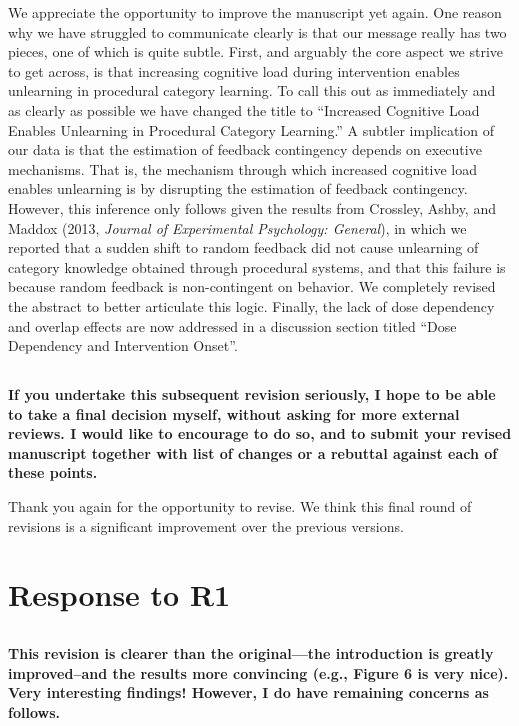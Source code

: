 \documentclass[10pt,a4paper]{article}
\begin{document}
We appreciate the opportunity to improve the manuscript yet again. One reason
why we have struggled to communicate clearly is that our message really has two
pieces, one of which is quite subtle. First, and arguably the core aspect we
strive to get across, is that increasing cognitive load during intervention
enables unlearning in procedural category learning. To call this out as
immediately and as clearly as possible we have changed the title to ``Increased
Cognitive Load Enables Unlearning in Procedural Category Learning.'' A subtler
implication of our data is that the estimation of feedback contingency depends
on executive mechanisms. That is, the mechanism through which increased
cognitive load enables unlearning is by disrupting the estimation of feedback
contingency. However, this inference only follows given the results from
Crossley, Ashby, and Maddox (2013, \emph{Journal of Experimental Psychology:
General}), in which we reported that a sudden shift to random feedback did not
cause unlearning of category knowledge obtained through procedural systems, and
that this failure is because random feedback is non-contingent on behavior. We
completely revised the abstract to better articulate this logic. Finally, the
lack of dose dependency and overlap effects are now addressed in a discussion
section titled ``Dose Dependency and Intervention Onset''.

\subsection{} \textbf{If you undertake this subsequent revision seriously, I
  hope to be able to take a final decision myself, without asking for more
  external reviews. I would like to encourage to do so, and to submit your revised
  manuscript together with list of changes or a rebuttal against each of these
  points.}

Thank you again for the opportunity to revise. We think this final round of
revisions is a significant improvement over the previous versions.

\section{Response to R1}
\subsection{} \textbf{This revision is clearer than the original—the introduction
  is greatly improved--and the results more convincing (e.g., Figure 6 is very
  nice). Very interesting findings! However, I do have remaining concerns as
  follows.}
\end{document}
